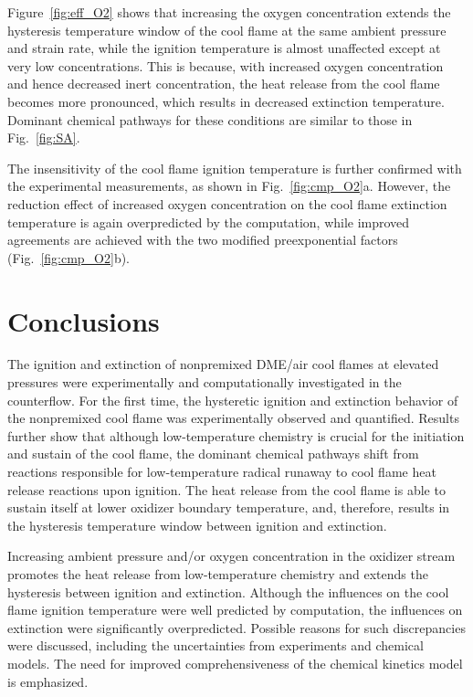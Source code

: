 \documentclass[review,3p,times]{elsarticle}
\begin{document}
Figure~\ref{fig:eff_O2} shows that increasing the oxygen concentration extends the hysteresis temperature window of the cool flame at the same ambient pressure and strain rate, while the ignition temperature is almost unaffected except at very low concentrations.  This is because, with increased oxygen concentration and hence decreased inert concentration, the heat release from the cool flame becomes more pronounced, which results in decreased extinction temperature.  Dominant chemical pathways for these conditions are similar to those in Fig.~\ref{fig:SA}.

The insensitivity of the cool flame ignition temperature is further confirmed with the experimental measurements, as shown in Fig.~\ref{fig:cmp_O2}a.  However, the reduction effect of increased oxygen concentration on the cool flame extinction temperature is again overpredicted by the computation, while improved agreements are achieved with the two modified preexponential factors (Fig.~\ref{fig:cmp_O2}b).


\section{Conclusions}

The ignition and extinction of nonpremixed DME/air cool flames at elevated pressures were experimentally and computationally investigated in the counterflow.  For the first time, the hysteretic ignition and extinction behavior of the nonpremixed cool flame was experimentally observed and quantified.  Results further show that although low-temperature chemistry is crucial for the initiation and sustain of the cool flame, the dominant chemical pathways shift from reactions responsible for low-temperature radical runaway to cool flame heat release reactions upon ignition.  The heat release from the cool flame is able to sustain itself at lower oxidizer boundary temperature, and, therefore, results in the hysteresis temperature window between ignition and extinction.

Increasing ambient pressure and/or oxygen concentration in the oxidizer stream promotes the heat release from low-temperature chemistry and extends the hysteresis between ignition and extinction.  Although the influences on the cool flame ignition temperature were well predicted by computation, the influences on extinction were significantly overpredicted.  Possible reasons for such discrepancies were discussed, including the uncertainties from experiments and chemical models. The need for improved comprehensiveness of the chemical kinetics model is emphasized. 
\end{document}
